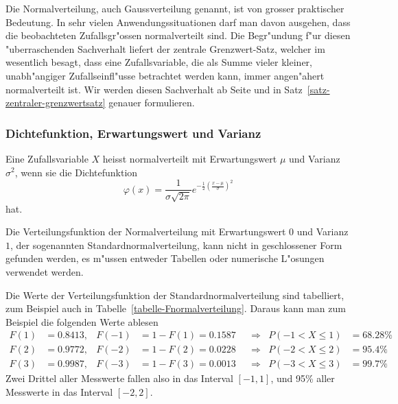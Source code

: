 Die Normalverteilung, auch Gaussverteilung genannt, ist von grosser praktischer
Bedeutung.
In sehr vielen Anwendungssituationen darf man davon ausgehen,
dass die beobachteten Zufallsgr"ossen normalverteilt sind.
Die Begr"undung
f"ur diesen "uberraschenden Sachverhalt liefert der zentrale Grenzwert-Satz,
welcher im wesentlich besagt, dass eine Zufallsvariable, die als Summe vieler
kleiner, unabh"angiger Zufallseinfl"usse betrachtet werden kann, immer
angen"ahert normalverteilt ist.
Wir werden diesen Sachverhalt ab Seite \pageref{zentraler-grenzwertsatz}
und in Satz~\ref{satz-zentraler-grenzwertsatz} genauer formulieren.

\subsubsection{Dichtefunktion, Erwartungswert und Varianz}
\begin{definition}
Eine Zufallsvariable $X$ heisst normalverteilt mit Erwartungswert $\mu$ und
Varianz $\sigma^2$, wenn sie die
Dichtefunktion
\[
\varphi(x)=\frac1{\sigma\sqrt{2\pi}}e^{-\frac{1}{2}
\left(\frac{x-\mu}{\sigma}\right)^2}
\]
hat.
\end{definition}
%
%
Die Verteilungsfunktion der Normalverteilung mit Erwartungswert $0$
und Varianz $1$, der sogenannten Standardnormalverteilung, kann nicht in
geschlossener Form gefunden werden, es m"ussen entweder Tabellen
oder numerische L"osungen verwendet werden.

Die Werte der Verteilungsfunktion der Standardnormalverteilung sind 
tabelliert, zum Beispiel auch in Tabelle~\ref{tabelle-Fnormalverteilung}.
Daraus kann man zum Beispiel die folgenden Werte ablesen
\begin{align*}
F(1)&=0.8413,&F(-1)&=1-F(1)=0.1587&&\Rightarrow&P(-1<X\le 1)&=68.28\%\\
F(2)&=0.9772,&F(-2)&=1-F(2)=0.0228&&\Rightarrow&P(-2<X\le 2)&=95.4\%\\
F(3)&=0.9987,&F(-3)&=1-F(3)=0.0013&&\Rightarrow&P(-3<X\le 3)&=99.7\%
\end{align*}
Zwei Drittel aller Messwerte fallen also in das Interval $[-1,1]$, und 95\%
aller Messwerte in das Interval $[-2,2]$.

